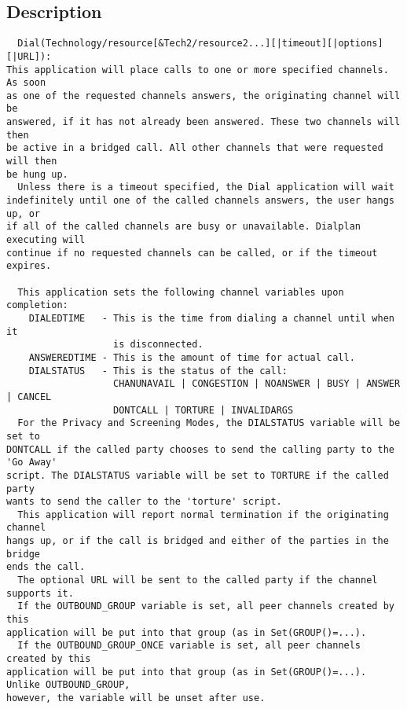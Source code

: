\subsection{Description}
\begin{verbatim}
  Dial(Technology/resource[&Tech2/resource2...][|timeout][|options][|URL]):
This application will place calls to one or more specified channels. As soon
as one of the requested channels answers, the originating channel will be
answered, if it has not already been answered. These two channels will then
be active in a bridged call. All other channels that were requested will then
be hung up.
  Unless there is a timeout specified, the Dial application will wait
indefinitely until one of the called channels answers, the user hangs up, or
if all of the called channels are busy or unavailable. Dialplan executing will
continue if no requested channels can be called, or if the timeout expires.

  This application sets the following channel variables upon completion:
    DIALEDTIME   - This is the time from dialing a channel until when it
                   is disconnected.
    ANSWEREDTIME - This is the amount of time for actual call.
    DIALSTATUS   - This is the status of the call:
                   CHANUNAVAIL | CONGESTION | NOANSWER | BUSY | ANSWER | CANCEL
                   DONTCALL | TORTURE | INVALIDARGS
  For the Privacy and Screening Modes, the DIALSTATUS variable will be set to
DONTCALL if the called party chooses to send the calling party to the 'Go Away'
script. The DIALSTATUS variable will be set to TORTURE if the called party
wants to send the caller to the 'torture' script.
  This application will report normal termination if the originating channel
hangs up, or if the call is bridged and either of the parties in the bridge
ends the call.
  The optional URL will be sent to the called party if the channel supports it.
  If the OUTBOUND_GROUP variable is set, all peer channels created by this
application will be put into that group (as in Set(GROUP()=...).
  If the OUTBOUND_GROUP_ONCE variable is set, all peer channels created by this
application will be put into that group (as in Set(GROUP()=...). Unlike OUTBOUND_GROUP,
however, the variable will be unset after use.


\end{verbatim}
